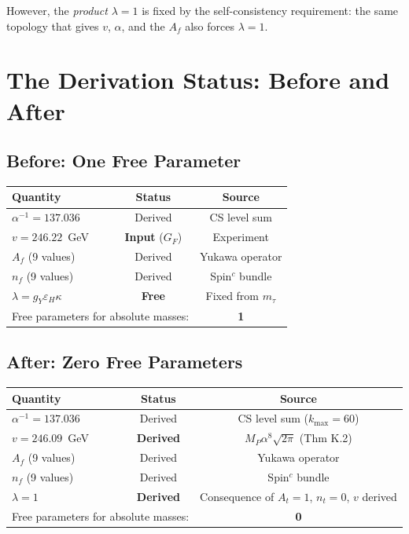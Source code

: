 \documentclass[11pt,a4paper]{article}
\theoremstyle{definition}
\theoremstyle{remark}
\begin{document}
However, the \emph{product} $\lambda = 1$ is fixed by the self-consistency
requirement: the same topology that gives $v$, $\alpha$, and the $A_f$
also forces $\lambda = 1$.

\section{The Derivation Status: Before and After}
\label{sec:status}

\subsection{Before: One Free Parameter}

\begin{center}
\begin{tabular}{lcc}
\toprule
Quantity & Status & Source \\
\midrule
$\alpha^{-1} = 137.036$ & Derived & CS level sum \\
$v = 246.22$~GeV & \textbf{Input} ($G_F$) & Experiment \\
$A_f$ (9 values) & Derived & Yukawa operator \\
$n_f$ (9 values) & Derived & Spin$^c$ bundle \\
$\lambda = g_Y\varepsilon_H\kappa$ & \textbf{Free} & Fixed from $m_\tau$ \\
\midrule
\multicolumn{2}{l}{Free parameters for absolute masses:} & \textbf{1} \\
\bottomrule
\end{tabular}
\end{center}

\subsection{After: Zero Free Parameters}

\begin{center}
\begin{tabular}{lcc}
\toprule
Quantity & Status & Source \\
\midrule
$\alpha^{-1} = 137.036$ & Derived & CS level sum ($k_{\max} = 60$) \\
$v = 246.09$~GeV & \textbf{Derived} & $M_P\alpha^8\sqrt{2\pi}$ (Thm K.2) \\
$A_f$ (9 values) & Derived & Yukawa operator \\
$n_f$ (9 values) & Derived & Spin$^c$ bundle \\
$\lambda = 1$ & \textbf{Derived} & Consequence of $A_t = 1$, $n_t = 0$, $v$ derived \\
\midrule
\multicolumn{2}{l}{Free parameters for absolute masses:} & \textbf{0} \\
\bottomrule
\end{tabular}
\end{center}
\end{document}
